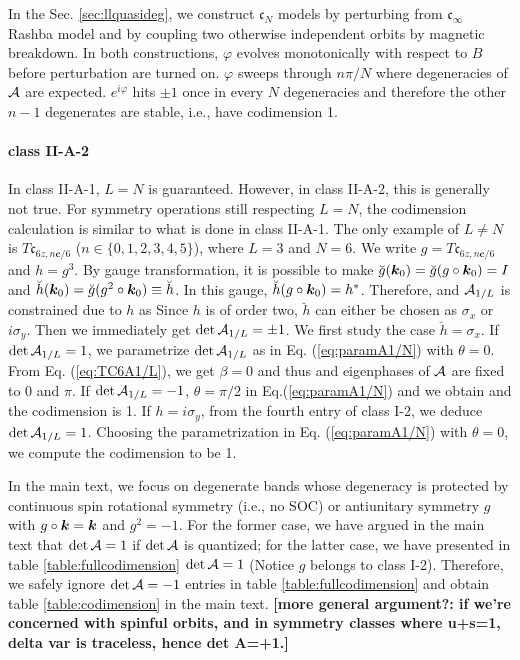 \documentclass[aps, prb, showpacs, twocolumn, notitlepage, superscriptaddress]{revtex4-1}
\begin{document}
In the Sec. \ref{sec:llquasideg}, we construct $\mathfrak{c}_N$ models by perturbing from $\mathfrak{c}_\infty$ Rashba model and by coupling two otherwise independent orbits by magnetic breakdown. In both constructions, $\varphi$ evolves monotonically with respect to $B$ before perturbation are turned on. $\varphi$ sweeps through $n\pi/N$ where degeneracies of ${\cal A}$ are expected. $e^{i\varphi}$ hits $\pm 1$ once in every $N$ degeneracies and therefore the other $n-1$ degenerates are stable, i.e., have codimension 1.

\paragraph*{class II-A-2} In class II-A-1, $L=N$ is guaranteed. However, in class II-A-2, this is generally not true. For symmetry operations still respecting $L=N$, the codimension calculation is similar to what is done in class II-A-1. The only example of $L\ne N$ is $T\mathfrak{c}_{6z,n\boldsymbol{c}/6}$ ($n\in\{0,1,2,3,4,5\}$), where $L=3$ and $N=6$. We write $g=T\mathfrak{c}_{6z,n\boldsymbol{c}/6}$ and $h=g^3$. By gauge transformation, it is possible to make $\breve{g}(\boldsymbol{k}_0)=\breve{g}(g\circ\boldsymbol{k}_0)=I$ and $\breve{h}(\boldsymbol{k}_0)=\breve{g}(g^2\circ \boldsymbol{k}_0)\equiv\breve{h}$. In this gauge, $\breve{h}(g\circ\boldsymbol{k}_0)=h^*$. Therefore,
and ${\cal A}_{1/L}$ is constrained due to $h$ as 
Since $h$ is of order two, $\breve{h}$ can either be chosen as $\sigma_x$ or $i\sigma_y$. Then we immediately get $\det {\cal A}_{1/L} = \pm 1$. We first study the case $\breve{h}=\sigma_x$. If $\det {\cal A}_{1/L} = 1$, we parametrize $\det {\cal A}_{1/L}$ as in Eq. (\ref{eq:paramA1/N}) with $\theta=0$. From Eq. (\ref{eq:TC6A1/L}), we get $\beta=0$ and thus 
and eigenphases of ${\cal A}$ are fixed to $0$ and $\pi$. If $\det{{\cal A}_{1/L}}=-1$, $\theta=\pi/2$ in Eq.(\ref{eq:paramA1/N}) and we obtain
and the codimension is 1. If $h=i\sigma_y$, from the fourth entry of class I-2, we deduce $\det {\cal A}_{1/L}=1$. Choosing the parametrization in Eq. (\ref{eq:paramA1/N}) with $\theta=0$, we compute the codimension to be 1.

In the main text, we focus on degenerate bands whose degeneracy is protected by continuous spin rotational symmetry (i.e., no SOC) or antiunitary symmetry $g$ with $g\circ \boldsymbol{k}=\boldsymbol{k}$ and $g^2=-1$. For the former case, we have argued in the main text that $\det{{\cal A}}=1$ if $\det{{\cal A}}$ is quantized; for the latter case, we have presented in table \ref{table:fullcodimension} $\det{{\cal A}}=1$ (Notice $g$ belongs to class I-2). Therefore, we safely ignore $\det{{\cal A}}=-1$ entries in table \ref{table:fullcodimension} and obtain table \ref{table:codimension} in the main text. \textbf{[more general argument?:  if we’re concerned with spinful orbits, and in symmetry classes where u+s=1, delta var is traceless, hence det A=+1.]
}
\end{document}
